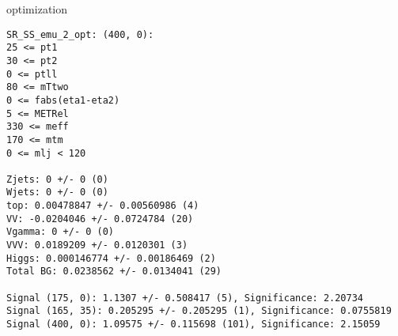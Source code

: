 \begin{frame}[fragile]{optimization}
\tiny
\begin{verbatim}
SR_SS_emu_2_opt: (400, 0):
25 <= pt1
30 <= pt2
0 <= ptll
80 <= mTtwo
0 <= fabs(eta1-eta2)
5 <= METRel
330 <= meff
170 <= mtm
0 <= mlj < 120

Zjets: 0 +/- 0 (0)
Wjets: 0 +/- 0 (0)
top: 0.00478847 +/- 0.00560986 (4)
VV: -0.0204046 +/- 0.0724784 (20)
Vgamma: 0 +/- 0 (0)
VVV: 0.0189209 +/- 0.0120301 (3)
Higgs: 0.000146774 +/- 0.00186469 (2)
Total BG: 0.0238562 +/- 0.0134041 (29)

Signal (175, 0): 1.1307 +/- 0.508417 (5), Significance: 2.20734
Signal (165, 35): 0.205295 +/- 0.205295 (1), Significance: 0.0755819
Signal (400, 0): 1.09575 +/- 0.115698 (101), Significance: 2.15059
\end{verbatim}
\end{frame}
